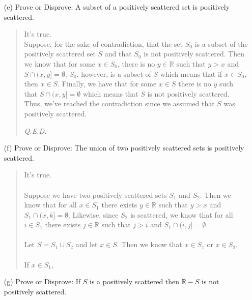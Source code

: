 \documentclass[12pt, a4paper]{article}                      %
\begin{document}
\begin{itemize}
\begin{itemize}
\item[(e)]
Prove or Disprove: A subset of a positively scattered set is positively scattered.
\begin{quote}
It's true.\\
Suppose, for the sake of contradiction, that the set $S_0$ is a subset of the positively
scattered set $S$ and that $S_0$ is not positively scattered. Then we know that for some
$x \in S_0$, there is no $y \in \mathbb{R}$ such that $y > x$ and $S \cap (x, y] = \emptyset$.
$S_0$, however, is a subset of $S$ which means that if $x \in S_0$, then $x \in S$. Finally, we have
that for some $x \in S$ there is no $y$ such that $S \cap (x, y] = \emptyset$
which means that $S$ is not positively scattered. Thus, we've reached the contradiction since we
assumed that $S$ was positively scattered.
\begin{flushright}
\textit{Q.E.D.}
\end{flushright}
\end{quote}

\item[]

\item[(f)]
Prove or Disprove: The union of two positively scattered sets is positively scattered.
\begin{quote}
It's true.\\\\
Suppose we have two positively scattered sets $S_1$ and $S_2$. Then we know that for all
$x \in S_1$ there exists $y \in \mathbb{R}$ such that $y > x$ and $S_1 \cap (x, k] = \emptyset$.
Likewise, since $S_2$ is scattered, we know that for all
$i \in S_1$ there exists $j \in \mathbb{R}$ such that $j > i$ and $S_1 \cap (i, j] = \emptyset$.\\\\
Let $S = S_1 \cup S_2$ and let $x \in S$. Then we know that $x \in S_1$ or $x \in S_2$.\\\\
If $x \in S_1$, 
\end{quote}

\item[]

\item[(g)]
Prove or Disprove: If $S$ is a positively scattered then $\mathbb{R} - S$ is not positively
scattered.
\begin{quote}

\end{quote}
\end{itemize}



\end{itemize} 
\end{document}
